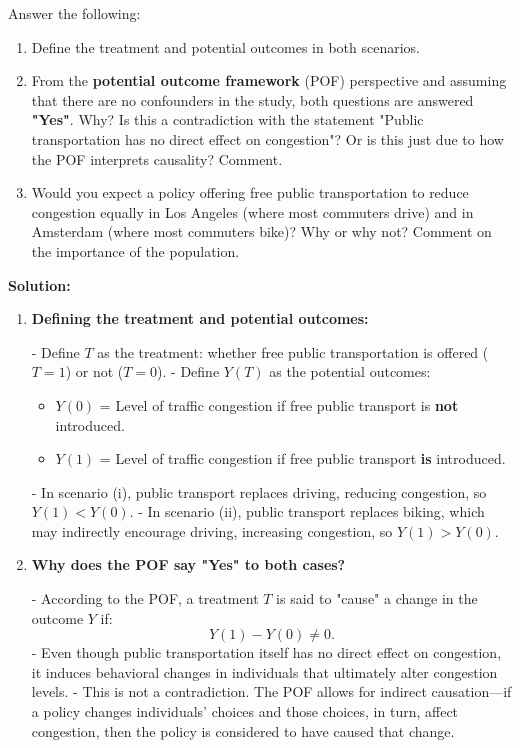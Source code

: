 \documentclass[12pt]{article}
\newif\ifsolutions
\begin{document}
\begin{enumerate}
Answer the following:
\begin{enumerate}[label=(\alph*)]
    \item Define the treatment and potential outcomes in both scenarios.

    \item From the \textbf{potential outcome framework} (POF) perspective and assuming that there are no confounders in the study, both questions are answered \textbf{"Yes"}. Why? Is this a contradiction with the statement "Public transportation has no direct effect on congestion"? Or is this just due to how the POF interprets causality? Comment.

    \item Would you expect a policy offering free public transportation to reduce congestion equally in Los Angeles (where most commuters drive) and in Amsterdam (where most commuters bike)? Why or why not? Comment on the importance of the population.
\end{enumerate}

\ifsolutions \color{blue} \textbf{Solution:}

\begin{enumerate}[label=(\alph*)]

    \item \textbf{Defining the treatment and potential outcomes:}
    
    - Define \( T \) as the treatment: whether free public transportation is offered (\( T = 1 \)) or not (\( T = 0 \)).
    - Define \( Y(T) \) as the potential outcomes:
      \begin{itemize}
          \item \( Y(0) \) = Level of traffic congestion if free public transport is \textbf{not} introduced.
          \item \( Y(1) \) = Level of traffic congestion if free public transport \textbf{is} introduced.
      \end{itemize}
    - In scenario (i), public transport replaces driving, reducing congestion, so \( Y(1) < Y(0) \).
    - In scenario (ii), public transport replaces biking, which may indirectly encourage driving, increasing congestion, so \( Y(1) > Y(0) \).

    \item \textbf{Why does the POF say "Yes" to both cases?}  

    - According to the POF, a treatment \( T \) is said to "cause" a change in the outcome \( Y \) if:
      \[
      Y(1) - Y(0) \neq 0.
      \]
    - Even though public transportation itself has no direct effect on congestion, it induces behavioral changes in individuals that ultimately alter congestion levels.  
    - This is not a contradiction. The POF allows for indirect causation—if a policy changes individuals’ choices and those choices, in turn, affect congestion, then the policy is considered to have caused that change.


\end{enumerate}
\end{enumerate}
\end{document}
